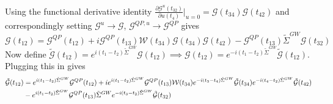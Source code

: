 \begin{tcolorbox}
Using the functional derivative identity $\frac{\partial \mathcal{G}^{u}(t_{32})}{\partial u(t_4)}|_{u=0} = \mathcal{G}(t_{34}) \mathcal{G}(t_{42})$ and correspondingly setting $\mathcal{G}^{u}\rightarrow \mathcal{G}$, $\mathcal{G}^{Q P, u}\rightarrow \mathcal{G}^{Q P}$ gives
\begin{equation}
\mathcal{G}(t_{12}) = \mathcal{G}^{Q P}(t_{12}) + i \mathcal{G}^{Q P}(t_{13}) \mathcal{W}(t_{34}) \mathcal{G}(t_{34}) \mathcal{G}(t_{42}) - \mathcal{G}^{Q P}(t_{13}) \tilde{\Sigma}^{GW} \mathcal{G}(t_{32})
\end{equation}
Now define $\tilde{\mathcal{G}}(t_{12}) = e^{i (t_1 - t_2) \tilde{\Sigma}^{GW}} \mathcal{G}(t_{12}) \implies \mathcal{G}(t_{12}) = e^{-i (t_1 - t_2) \tilde{\Sigma}^{GW}} \tilde{\mathcal{G}}(t_{12})$. Plugging this in gives
\begin{align}
\tilde{\mathcal{G}}(t_{12}) &= e^{i (t_1 - t_2) \tilde{\Sigma}^{GW}} \mathcal{G}^{Q P}(t_{12}) + i e^{i (t_1 - t_2) \tilde{\Sigma}^{GW}} \mathcal{G}^{Q P}(t_{13}) \mathcal{W}(t_{34}) e^{-i (t_3 - t_4) \tilde{\Sigma}^{GW}} \tilde{\mathcal{G}}(t_{34}) e^{-i (t_4 - t_2) \tilde{\Sigma}^{GW}} \tilde{\mathcal{G}}(t_{42}) \notag \\
& - e^{i (t_1 - t_2) \tilde{\Sigma}^{GW}} \mathcal{G}^{Q P}(t_{13}) \tilde{\Sigma}^{GW} e^{-i (t_3 - t_2) \tilde{\Sigma}^{GW}} \tilde{\mathcal{G}}(t_{32}) \notag \\
\end{align}

\end{tcolorbox}
